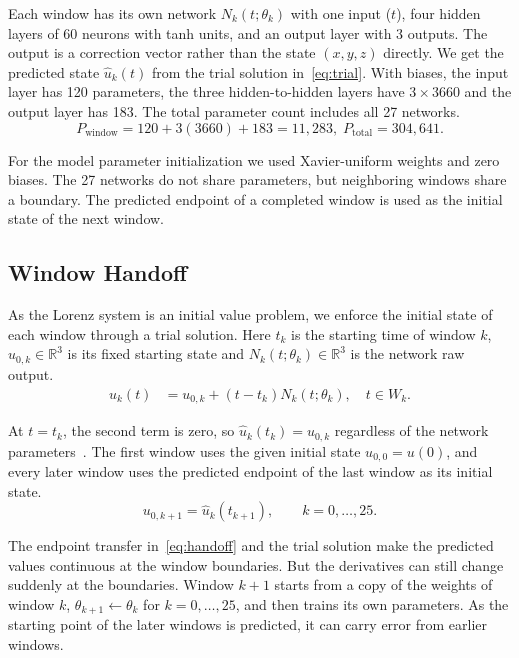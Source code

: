 \documentclass[conference,a4paper]{IEEEtran}
\begin{document}
Each window has its own network $N_k(t;\theta_k)$ with one input ($t$), four hidden layers of 60 neurons with tanh units, and an output layer with 3 outputs. The output is a correction vector rather than the state $(x,y,z)$ directly. We get the predicted state $\hat{u}_k(t)$ from the trial solution in~\eqref{eq:trial}. With biases, the input layer has 120 parameters, the three hidden-to-hidden layers have $3\times3660$ and the output layer has 183. The total parameter count includes all 27 networks.
\[
P_{\mathrm{window}}=120+3(3660)+183=11{,}283,\; P_{\mathrm{total}}=304{,}641.
\]

For the model parameter initialization we used Xavier-uniform weights and zero biases. The 27 networks do not share parameters, but neighboring windows share a boundary. The predicted endpoint of a completed window is used as the initial state of the next window.

\subsection{Window Handoff}
As the Lorenz system is an initial value problem, we enforce the initial state of each window through a trial solution. Here $t_k$ is the starting time of window $k$, $u_{0,k}\in\mathbb{R}^3$ is its fixed starting state and $N_k(t;\theta_k)\in\mathbb{R}^3$ is the network raw output.
\begin{equation}
\begin{aligned}
\hat{u}_k(t)
  &=u_{0,k}+(t-t_k)N_k(t;\theta_k),\quad t\in W_k.
\end{aligned}
\label{eq:trial}
\end{equation}



At $t=t_k$, the second term is zero, so $\hat{u}_k(t_k)=u_{0,k}$ regardless of the network parameters~\cite{lagaris1998}. The first window uses the given initial state $u_{0,0}=u(0)$, and every later window uses the predicted endpoint of the last window as its initial state.
\begin{equation}
u_{0,k+1}=\hat{u}_k(t_{k+1}), \qquad k=0,\ldots,25.
\label{eq:handoff}
\end{equation}

The endpoint transfer in~\eqref{eq:handoff} and the trial solution make the predicted values continuous at the window boundaries. But the derivatives can still change suddenly at the boundaries. Window $k+1$ starts from a copy of the weights of window $k$, $\theta_{k+1}\leftarrow\theta_k$ for $k=0,\ldots,25$, and then trains its own parameters. As the starting point of the later windows is predicted, it can carry error from earlier windows.
\end{document}

